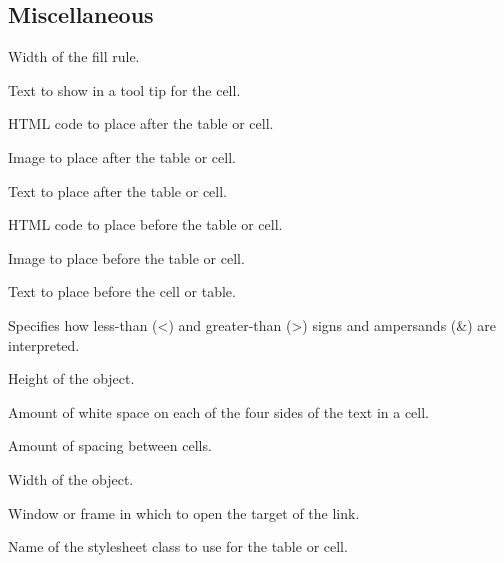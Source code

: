 \subsection{Miscellaneous}

\begin{description}


Width of the fill rule.

Text to show in a tool tip for the cell.

HTML code to place after the table or cell.

Image to place after the table or cell.

Text to place after the table or cell.

HTML code to place before the table or cell.

Image to place before the table or cell.

Text to place before the cell or table.

Specifies how less-than (<) and greater-than (>) signs and ampersands (\&) are interpreted.

Height of the object.

Amount of white space on each of the four sides of the text in a cell.





Amount of spacing between cells.

Width of the object.



Window or frame in which to open the target of the link.

Name of the stylesheet class to use for the table or cell.


\end{description}
